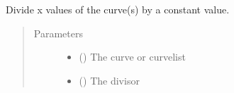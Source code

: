 \documentclass[letterpaper,10pt,english]{sphinxmanual}
\begin{document}
\begin{fulllineitems}
\label{\detokenize{pydv:pydvpy.divx}}
Divide x values of the curve(s) by a constant value.

\begin{sphinxVerbatim}[commandchars=\\\{\}]
  
\end{sphinxVerbatim}

\begin{sphinxVerbatim}[commandchars=\\\{\}]
 
\end{sphinxVerbatim}
\begin{quote}\begin{description}
\item[{Parameters}] \leavevmode\begin{itemize}
\item {} 
 ({\hyperref[\detokenize{pydv:curve.Curve}]{}}) \textendash{} The curve or curvelist

\item {} 
 () \textendash{} The divisor

\end{itemize}

\end{description}\end{quote}

\end{fulllineitems}

\end{document}
